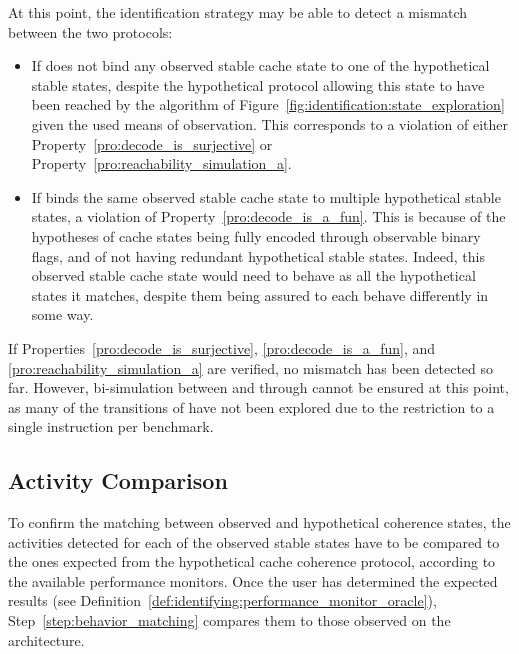 At this point, the identification strategy may be able to detect a mismatch
between the two protocols:
\begin{itemize}
\item
   If \decodefun{} does not bind any observed stable cache state to one of the
   hypothetical stable states, despite the hypothetical protocol allowing this
   state to have been reached by the algorithm of
   Figure~\ref{fig:identification:state_exploration} given the used means of
   observation. This corresponds to a violation of either
   Property~\ref{pro:decode_is_surjective} or
   Property~\ref{pro:reachability_simulation_a}.
\item
   If \decodefun{} binds the same observed stable cache state to multiple
   hypothetical stable states, a violation of
   Property~\ref{pro:decode_is_a_fun}. This is because of the hypotheses of
   cache states being fully encoded through observable binary flags, and of not
   having redundant hypothetical stable states. Indeed, this observed stable
   cache state would need to behave as all the hypothetical states it matches,
   despite them being assured to each behave differently in some way.
\end{itemize}
If Properties~\ref{pro:decode_is_surjective}, \ref{pro:decode_is_a_fun}, and
\ref{pro:reachability_simulation_a} are verified, no mismatch has been detected
so far. However, bi-simulation between \hypreachfun{} and \obsreachfun{} through
\decodefun{} cannot be ensured at this point, as many of the transitions of
\hypreachfun{} have not been explored due to the restriction to a single
instruction per benchmark.

\subsection{Activity Comparison}
To confirm the matching between observed and hypothetical coherence states, the
activities detected for each of the observed stable states have to be compared
to the ones expected from the hypothetical cache coherence protocol, according
to the available performance monitors. Once the user has determined the expected
results (see Definition~\ref{def:identifying:performance_monitor_oracle}),
Step~\ref{step:behavior_matching} compares them to those observed on the
architecture.

